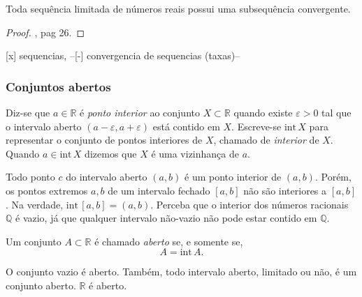 \begin{corolario}\label{prop:bolzano-weierstrass}
	Toda sequência limitada de números reais possui uma subsequência convergente.
	\begin{proof}
		\cite{elonAnalise1}, pag 26.
	\end{proof}
\end{corolario}


{\color{red}[x] sequencias, 
--[-] convergencia de sequencias (taxas)--
}

\subsubsection{Conjuntos abertos}
\begin{definicao}
	Diz-se que $a\in \mathbb{R}$ é \textit{ponto interior} ao conjunto $X\subset \mathbb{R}$ quando existe $\varepsilon>0$ tal que o intervalo aberto $(a-\varepsilon, a+\varepsilon)$ está contido em $X$. Escreve-se $\text{int}\, X$ para representar o conjunto de pontos interiores de $X$, chamado de \textit{interior} de $X$. Quando $a\in\text{int}\, X$ dizemos que $X$ é uma vizinhança de $a$.
\end{definicao}

\begin{exemplo}
	Todo ponto $c$ do intervalo aberto $(a,b)$ é um ponto interior de $(a,b)$. Porém, os pontos extremos $a,b$ de um intervalo fechado $[a,b]$ não são interiores a $[a,b]$. Na verdade, $\text{int}\,[a,b] = (a,b)$. Perceba que o interior dos números racionais $\mathbb{Q}$ é vazio, já que qualquer intervalo não-vazio não pode estar contido em $\mathbb{Q}$.
\end{exemplo}

\begin{definicao}
	Um conjunto $A\subset \mathbb{R}$ é chamado \textit{aberto} se, e somente se, $$A=\text{int}\,A.$$
\end{definicao}

\begin{exemplo}
	O conjunto vazio é aberto. Também, todo intervalo aberto, limitado ou não, é um conjunto aberto. $\mathbb{R}$ é aberto. 
\end{exemplo}

